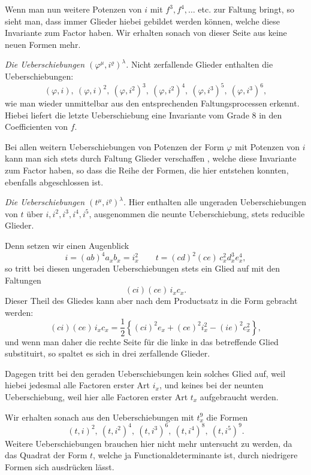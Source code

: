 \documentclass[11pt]{article}
\providecommand{\weberpage}[1]{}
\begin{document}
Wenn man nun weitere Potenzen von $i$ mit $f^3, f^4, \ldots$ etc. zur
Faltung bringt, so sieht man, dass immer Glieder hiebei gebildet
werden k\"onnen, welche diese Invariante zum Factor haben. Wir erhalten
 sonach von dieser Seite aus keine neuen Formen mehr.

\textit{Die Ueberschiebungen $(\varphi^\mu, i^\varrho)^\lambda$.} Nicht zerfallende Glieder enthalten
 die Ueberschiebungen:
\[
(\varphi, i),\ (\varphi, i)^2,\ (\varphi, i^2)^3,\ (\varphi, i^2)^4,\ (\varphi, i^3)^5,\ (\varphi, i^3)^6,
\]
wie man wieder unmittelbar aus den entsprechenden Faltungsprocessen
erkennt. Hiebei liefert die letzte Ueberschiebung eine Invariante vom
Grade 8 in den Coefficienten von $f$.

Bei allen weitern Ueberschiebungen von Potenzen der Form $\varphi$
mit Potenzen von $i$ kann man sich stets durch Faltung Glieder verschaffen
, welche diese Invariante zum Factor haben, so dass die Reihe
der Formen, die hier entstehen konnten, ebenfalls abgeschlossen ist.

\textit{Die Ueberschiebungen $(t^\mu, i^\varrho)^\lambda$.} Hier enthalten alle ungeraden
Ueberschiebungen von $t$ \"uber $i, i^2, i^3, i^4, i^5$, ausgenommen die neunte
Ueberschiebung, stets reducible Glieder.

Denn setzen wir einen Augenblick
\[
i = (ab)^4 a_x b_x = i_x^2 \qquad
t = (cd)^2 (ce)\, c_x^2 d_x^3 e_x^4,
\]
so tritt bei diesen ungeraden Ueberschiebungen stets ein Glied auf
mit den Faltungen
\[
(ci)(ce)\, i_x c_x.
\]
Dieser Theil des Gliedes kann aber nach dem Productsatz in die
Form gebracht werden:
\[
(ci)(ce)\, i_x c_x = \frac{1}{2} \left\{ (ci)^2 e_x + (ce)^2 i_x^2 - (ie)^2 c_x^2 \right\},
\]
und wenn man daher die rechte Seite f\"ur die linke in das betreffende
Glied substituirt, so spaltet es sich in drei zerfallende Glieder.


\weberpage{239}
Dagegen tritt bei den geraden Ueberschiebungen kein solches
Glied auf, weil hiebei jedesmal alle Factoren erster Art $i_x$, und
keines bei der neunten Ueberschiebung, weil hier alle Factoren erster
Art $t_x$ aufgebraucht werden.

Wir erhalten sonach aus den Ueberschiebungen mit $t_x^9$ die Formen
\[
(t, i)^2,\ (t, i^2)^4,\ (t, i^3)^6,\ (t, i^4)^8,\ (t, i^5)^9.
\]
Weitere Ueberschiebungen brauchen hier nicht mehr untersucht
zu werden, da das Quadrat der Form $t$, welche ja Functionaldeterminante
 ist, durch niedrigere Formen sich ausdr\"ucken l\"asst.
\end{document}
